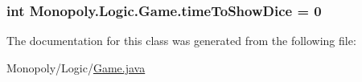 \subsubsection[{\texorpdfstring{time\+To\+Show\+Dice}{timeToShowDice}}]{\setlength{\rightskip}{0pt plus 5cm}int Monopoly.\+Logic.\+Game.\+time\+To\+Show\+Dice = 0\hspace{0.3cm}{\ttfamily [private]}}\hypertarget{class_monopoly_1_1_logic_1_1_game_a3fa0279ba0d3d1312e9f2a11dea01b87}{}\label{class_monopoly_1_1_logic_1_1_game_a3fa0279ba0d3d1312e9f2a11dea01b87}


The documentation for this class was generated from the following file\+:\begin{DoxyCompactItemize}
\item 
Monopoly/\+Logic/\hyperlink{_game_8java}{Game.\+java}\end{DoxyCompactItemize}
